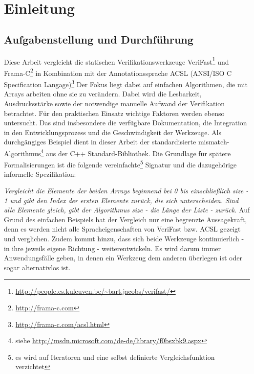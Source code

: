 ﻿\chapter{Einleitung}

\section{Aufgabenstellung und Durchführung}
\label{sec:aufgabenstellung}
Diese Arbeit vergleicht die statischen Verifikationswerkzeuge VeriFast\footnote{
\url{http://people.cs.kuleuven.be/~bart.jacobs/verifast/}} und Frama-C\footnote{\url{http://frama-c.com}} in Kombination
mit der Annotationssprache ACSL (ANSI/ISO C Specification Langage)\footnote{\url{http://frama-c.com/acsl.html}} 
Der Fokus liegt dabei auf einfachen Algorithmen, die mit Arrays arbeiten ohne sie zu verändern.
Dabei wird die Lesbarkeit, Ausdrucksstärke sowie der notwendige manuelle Aufwand der Verifikation betrachtet.
Für den praktischen Einsatz wichtige Faktoren werden ebenso untersucht. Das sind insbesondere die verfügbare 
Dokumentation, die Integration in den Entwicklungsprozess und die Geschwindigkeit der Werkzeuge.
\newline
\newline
Als durchgängiges Beispiel dient in dieser Arbeit der standardisierte mismatch-Algorithmus\footnote{siehe
\url{http://msdn.microsoft.com/de-de/library/f0bsxbk9.aspx}} aus
der C++ Standard-Bibliothek. Die Grundlage für spätere Formalisierungen ist die folgende vereinfachte\footnote{es
wird auf Iteratoren und eine selbst definierte Vergleichsfunktion verzichtet} Signatur und 
die dazugehörige informelle Spezifikation:

\lstset{frame=none, numbers=none}    

\lstset{frame=single, numbers=left}

\noindent \emph{Vergleicht die Elemente der beiden Arrays beginnend bei 0 bis einschließlich size - 1 und gibt den
Index der ersten Elemente zurück, die sich unterscheiden. Sind alle Elemente gleich, gibt der Algorithmus
size - die Länge der Liste - zurück.}
\newline
\newline
Auf Grund des einfachen Beispiels hat der Vergleich nur eine begrenzte Aussagekraft, denn es werden nicht alle
Spracheigenschaften von VeriFast bzw. ACSL gezeigt und verglichen. Zudem kommt hinzu, dass sich beide Werkzeuge
kontinuierlich - in ihre jeweils eigene Richtung - weiterentwickeln. Es wird darum immer Anwendungsfälle geben,
in denen ein Werkzeug dem anderen überlegen ist oder sogar alternativlos ist.



